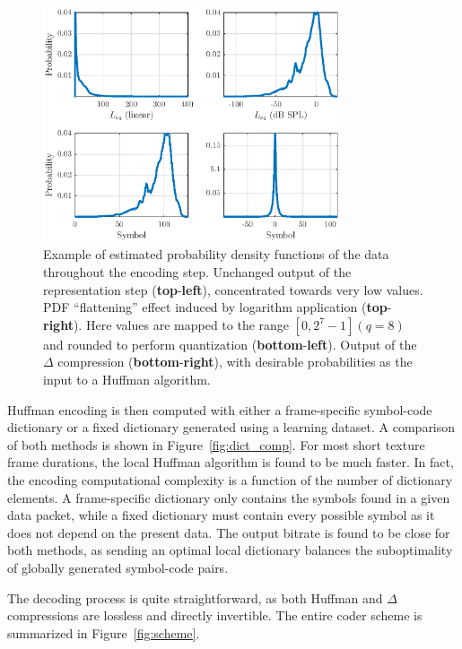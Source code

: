 \documentclass[sensors,article,accept,moreauthors,pdftex,10pt,a4paper]{mdpi}
\providecommand{\DIFaddtex}[1]{{\protect\color{blue}\uwave{#1}}} %
\providecommand{\DIFaddFL}[1]{\DIFadd{#1}} %
\providecommand{\DIFaddbeginFL}{} %
\providecommand{\DIFaddendFL}{} %
\providecommand{\DIFadd}[1]{\texorpdfstring{\DIFaddtex{#1}}{#1}} %
\begin{document}
\begin{figure}[H]
	\centering
		\includegraphics[width=0.78\textwidth]{figures/pdf.eps}
	\caption{Example of estimated probability density functions of the data throughout the encoding step. Unchanged output of the representation step (\textbf{top}-\textbf{left}), concentrated towards very low values. PDF ``flattening'' effect induced by logarithm application (\textbf{top}-\textbf{right}). \DIFaddbeginFL {\DIFaddendFL Here\DIFaddbeginFL \DIFaddFL{,}} \DIFaddendFL values are mapped to the range $[0, 2^7-1] (q=8)$ and rounded to perform quantization (\textbf{bottom}-\textbf{left}). Output of the $\Delta$ compression  (\textbf{bottom}-\textbf{right}), with desirable probabilities as the input to a Huffman algorithm.}
	\label{fig:pdf}
\end{figure}

Huffman encoding is then computed with either a frame-specific symbol-code dictionary or a fixed dictionary generated using a learning dataset. A comparison of both methods is shown in Figure~\ref{fig:dict_comp}. For most short texture frame durations, the local Huffman algorithm is found to be much faster. In fact, the encoding computational complexity is a function of the number of dictionary elements. A frame-specific dictionary only contains the symbols found in a given data packet, while a fixed dictionary must contain every possible symbol as it does not depend on the present data. The output bitrate is found to be close for both methods, as sending an optimal local dictionary balances the suboptimality of globally generated symbol-code pairs.

The decoding process is quite straightforward, as both Huffman and $\Delta$ compressions are lossless and directly invertible. The entire coder scheme is summarized in Figure~\ref{fig:scheme}.
\vspace{-12pt} 
\end{document}
